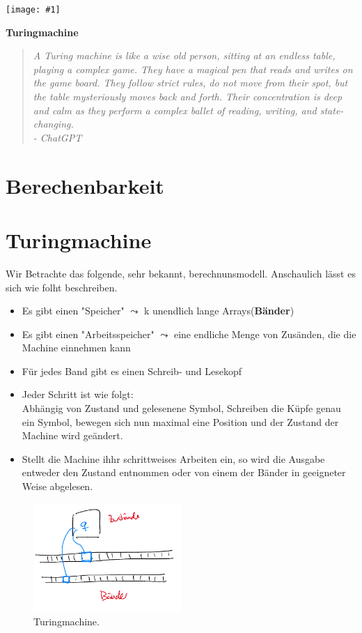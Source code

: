 \documentclass[a4paper,11pt]{article}
\newcommand{\coversection}[3]{
  \newpage
  \thispagestyle{empty}
  \begin{center}
    \vspace*{\fill}
    \texttt{[image: \#1]}
    \vspace*{0.5cm} %
    \par
    \Large\textbf{#2}
    \par\vspace{0.5cm} %
    \begin{quote}
      \itshape\small\raggedleft #3
    \end{quote}
    \par\vspace{\fill}
  \end{center}
  \newpage
}
\begin{document}
\coversection{turing.png}{Turingmachine}{A Turing machine is like a wise old person, sitting at an endless table, playing a complex game. They have a magical pen that reads and writes on the game board. They follow strict rules, do not move from their spot, but the table mysteriously moves back and forth. Their concentration is deep and calm as they perform a complex ballet of reading, writing, and state-changing.\\ \hspace*{\fill} - ChatGPT}
\section*{Berechenbarkeit}
\section{Turingmachine} 
\begin{sloppypar}
  Wir Betrachte das folgende, sehr bekannt, berechnunsmodell. Anschaulich lässt es sich wie folht beschreiben.
\end{sloppypar} 
\begin{itemize}
  \renewcommand\labelitemi{-}
  \item Es gibt einen "Speicher" $\leadsto $ k unendlich lange Arrays(\textbf{Bänder})
  \item Es gibt einen "Arbeitsspeicher" $\leadsto$ eine endliche Menge von Zusänden, die die Machine einnehmen kann
  \item Für jedes Band gibt es einen Schreib- und Lesekopf 
  \item Jeder Schritt ist wie folgt:\\ Abhängig von Zustand und gelesenene Symbol, Schreiben die Küpfe genau ein Symbol, bewegen sich nun maximal eine Position und der Zustand der Machine wird geändert.
  \item Stellt die Machine ihhr schrittweises Arbeiten ein, so wird die Ausgabe entweder den Zustand entnommen oder von einem der Bänder in geeigneter Weise abgelesen.
\end{itemize}

\begin{figure}[htp]
  \centering
  \includegraphics[width=0.5\textwidth]{turing_sym.png}
  \caption{Turingmachine.}
  \label{fig:tm}
\end{figure}
\end{document}
